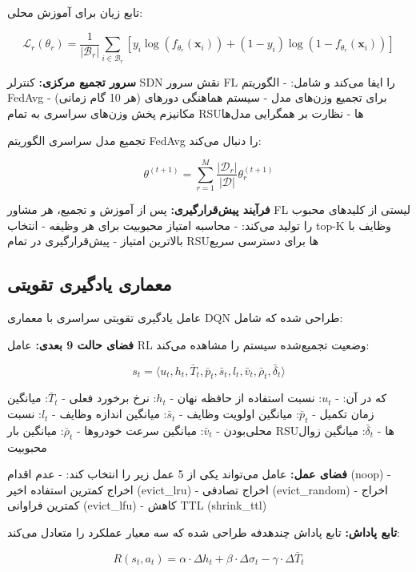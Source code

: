 \documentclass[11pt]{article}
\newcommand{\فصل}[1]{\section{#1}}
\newcommand{\قسمت}[1]{\subsection{#1}}
\begin{document}
تابع زیان برای آموزش محلی:

\begin{equation}
\mathcal{L}_r(\theta_r) = \frac{1}{|\mathcal{B}_r|} \sum_{i \in \mathcal{B}_r} \left[ y_i \log(f_{\theta_r}(\mathbf{x}_i)) + (1-y_i) \log(1-f_{\theta_r}(\mathbf{x}_i)) \right]
\end{equation}

\textbf{سرور تجمیع مرکزی:}
کنترلر SDN نقش سرور FL را ایفا می‌کند و شامل:
- الگوریتم FedAvg برای تجمیع وزن‌های مدل
- سیستم هماهنگی دورهای (هر 10 گام زمانی)
- مکانیزم پخش وزن‌های سراسری به تمام RSUها
- نظارت بر همگرایی مدل‌ها

تجمیع مدل سراسری الگوریتم FedAvg را دنبال می‌کند:

\begin{equation}
\theta^{(t+1)} = \sum_{r=1}^{M} \frac{|\mathcal{D}_r|}{|\mathcal{D}|} \theta_r^{(t+1)}
\end{equation}

\textbf{فرآیند پیش‌قرارگیری:}
پس از آموزش و تجمیع، هر مشاور FL لیستی از کلیدهای محبوب را تولید می‌کند:
- محاسبه امتیاز محبوبیت برای هر وظیفه
- انتخاب top-K وظایف با بالاترین امتیاز
- پیش‌قرارگیری در تمام RSUها برای دسترسی سریع

\قسمت{معماری یادگیری تقویتی}

عامل یادگیری تقویتی سراسری با معماری DQN طراحی شده که شامل:

\textbf{فضای حالت 9 بعدی:}
عامل RL وضعیت تجمیع‌شده سیستم را مشاهده می‌کند:

\begin{equation}
s_t = \langle u_t, h_t, \bar{T}_t, \bar{p}_t, \bar{s}_t, l_t, \bar{v}_t, \bar{\rho}_t, \bar{\delta}_t \rangle
\end{equation}

که در آن:
- $u_t$: نسبت استفاده از حافظه نهان
- $h_t$: نرخ برخورد فعلی
- $\bar{T}_t$: میانگین زمان تکمیل
- $\bar{p}_t$: میانگین اولویت وظایف
- $\bar{s}_t$: میانگین اندازه وظایف
- $l_t$: نسبت محلی‌بودن
- $\bar{v}_t$: میانگین سرعت خودروها
- $\bar{\rho}_t$: میانگین بار RSUها
- $\bar{\delta}_t$: میانگین زوال محبوبیت

\textbf{فضای عمل:}
عامل می‌تواند یکی از 5 عمل زیر را انتخاب کند:
- عدم اقدام (noop)
- اخراج کمترین استفاده اخیر (evict\_lru)
- اخراج تصادفی (evict\_random)  
- اخراج کمترین فراوانی (evict\_lfu)
- کاهش TTL (shrink\_ttl)

\textbf{تابع پاداش:}
تابع پاداش چندهدفه طراحی شده که سه معیار عملکرد را متعادل می‌کند:

\begin{equation}
R(s_t, a_t) = \alpha \cdot \Delta h_t + \beta \cdot \Delta \sigma_t - \gamma \cdot \Delta \bar{T}_t
\end{equation}
\end{document}
